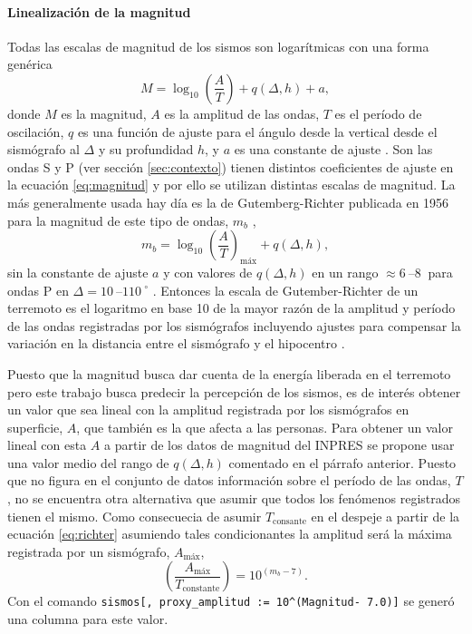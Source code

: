 \documentclass[a4paper]{report}
\begin{document}
\paragraph{Linealización de la magnitud}
Todas las escalas de magnitud de los sismos son logarítmicas con una forma genérica
\begin{equation}
	M = \log_{10} \left( \frac{A}{T} \right) + q(\Delta, h) + a,
	\label{eq:magnitud}
\end{equation}
donde \(M\) es la magnitud, \(A\) es la amplitud de las ondas, \(T\) es el período de oscilación, \(q\) es una función de ajuste para el ángulo desde la vertical desde el sismógrafo al \(\Delta\) y su profundidad \(h\), y \(a\) es una constante de ajuste \cite[ecuación 4.13]{fowler_solid_1990}.
Son las ondas S y P (ver sección \ref{sec:contexto}) tienen distintos coeficientes de ajuste en la ecuación \ref{eq:magnitud} y por ello se utilizan distintas escalas de magnitud.
La más generalmente usada hay día es la de Gutemberg-Richter publicada en 1956 para la magnitud de este tipo de ondas, \(m_b\) ,
\begin{equation}
	m_b = \log_{10} \left( \frac{A}{T} \right)_\text{máx} + q(\Delta, h),
	\label{eq:richter}
\end{equation}
sin la constante de ajuste \(a\) y con valores de \(q(\Delta, h)\) en un rango \(\approx \SIrange{6}{8}{}\)  para ondas P en \(\Delta = \SIrange{10}{110}{} ^\circ\) \cite[ecuación 4.18]{fowler_solid_1990}.
Entonces la escala de Gutember-Richter de un terremoto es el logaritmo en base \num{10} de la mayor razón de la amplitud y período de las ondas registradas por los sismógrafos incluyendo ajustes para compensar la variación en la distancia entre el sismógrafo y el hipocentro \cite{willian_l_ellsworth_earthquake_1991}.

Puesto que la magnitud busca dar cuenta de la energía liberada en el terremoto pero este trabajo busca predecir la percepción de los sismos, es de interés obtener un valor que sea lineal con la amplitud registrada por los sismógrafos en superficie, \(A\), que también es la que afecta a las personas. 
Para obtener un valor lineal con esta \(A\) a partir de los datos de magnitud del INPRES se propone usar una valor medio del rango de \(q(\Delta,h)\) comentado en el párrafo anterior.
Puesto que no figura en el conjunto de datos información sobre el período de las ondas, \(T\), no se encuentra otra alternativa que asumir que todos los fenómenos registrados tienen el mismo.
Como consecuecia de asumir \(T_\text{consante}\) en el despeje a partir de la ecuación \ref{eq:richter} asumiendo tales condicionantes la amplitud será la máxima registrada por un sismógrafo, \(A_\text{máx}\),
\begin{equation}
	\left( \frac{A_\text{máx}}{T_\text{constante}} \right) = 10^{(m_b - 7)}.
	\label{eq:linealizacionMagnitud} 
\end{equation}
Con el comando \verb'sismos[, proxy_amplitud := 10^(Magnitud- 7.0)]' se generó una columna para este valor.
\end{document}

